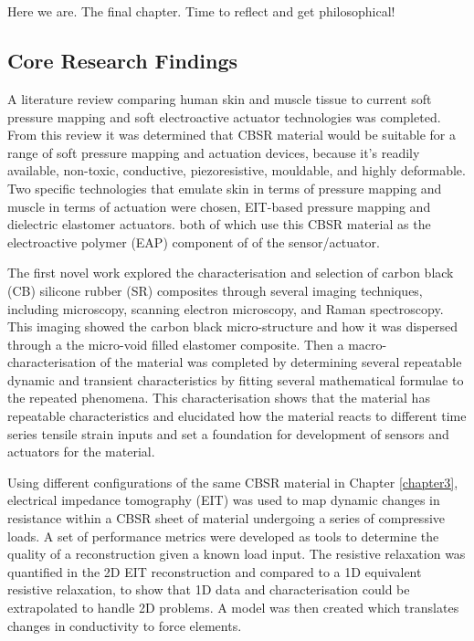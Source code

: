 \chapter{\chapixname}
\label{chapter9}
Here we are. The final chapter. Time to reflect and get philosophical!

\section{Core Research Findings}
A literature review comparing human skin and muscle tissue to current soft pressure mapping and soft electroactive actuator technologies was completed. From this review it was determined that CBSR material would be suitable for a range of soft pressure mapping and actuation devices, because it's readily available, non-toxic, conductive, piezoresistive, mouldable, and highly deformable. Two specific technologies that emulate skin in terms of pressure mapping and muscle in terms of actuation were chosen, EIT-based pressure mapping and dielectric elastomer actuators. 
both of which use this  CBSR material as the electroactive polymer (EAP) component of of the sensor/actuator.

The first novel work explored the characterisation and selection of carbon black (CB) silicone rubber (SR) composites through several imaging techniques, including microscopy, scanning electron microscopy, and Raman spectroscopy. This imaging showed the carbon black micro-structure and how it was dispersed through a the micro-void filled elastomer composite. Then a macro-characterisation of the material was completed by determining several repeatable dynamic and transient characteristics by fitting several mathematical formulae to the repeated phenomena. This characterisation shows that the material has repeatable characteristics and elucidated how the material reacts to different time series tensile strain inputs and set a foundation for development of sensors and actuators for the material.

Using different configurations of the same CBSR material in Chapter \ref{chapter3}, electrical impedance tomography (EIT) was used to map dynamic changes in resistance within a CBSR sheet of material undergoing a series of compressive loads. A set of performance metrics were developed as tools to determine the quality of a reconstruction given a known load input. The resistive relaxation was quantified in the 2D EIT reconstruction and compared to a 1D equivalent resistive relaxation, to show that 1D data and characterisation could be extrapolated to handle 2D problems. A model was then created which translates changes in conductivity to force elements. 

